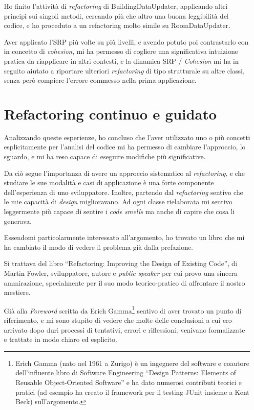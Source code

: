 \documentclass[12pt]{report}
\begin{document}
Ho finito l'attività di \textit{refactoring} di BuildingDataUpdater,
applicando altri principi sui singoli metodi, cercando più che altro
una buona leggibilità del codice,
e ho proceduto a un refactoring molto simile su RoomDataUpdater. 

Aver applicato l'SRP più volte su più livelli, e avendo potuto poi 
contrastarlo con in concetto di \textit{cohesion}, mi ha permesso 
di cogliere una significativa intuizione pratica da riapplicare in 
altri contesti, e la dinamica SRP / \textit{Cohesion} mi ha in seguito 
aiutato a riportare ulteriori \textit{refactoring} di tipo strutturale 
su altre classi, senza però compiere l'errore commesso nella 
prima applicazione.


%
%
%
%
\chapter{Refactoring continuo e guidato}
\label{cap5}

Analizzando queste esperienze, ho concluso che l'aver utilizzato uno o più
concetti esplicitamente per l'analisi del codice mi ha permesso di
cambiare l'approccio, lo sguardo, e mi ha reso capace di eseguire
modifiche più significative.

Da ciò segue l'importanza di avere un approccio sistematico al 
\textit{refactoring}, e che studiare le sue modalità e casi di applicazione
è una forte componente dell'esperienza di uno sviluppatore. Inoltre, partendo
dal \textit{refactoring} sentivo che le mie capacità di \textit{design}
miglioravano. Ad ogni classe rielaborata mi sentivo leggermente più
capace di sentire i \textit{code smells} ma anche di capire 
che cosa li generava.

Essendomi particolarmente interessato all'argomento, ho trovato un libro 
che mi ha cambiato il modo di vedere il problema già dalla prefazione.

Si trattava del libro ``Refactoring: Improving the Design of
Existing Code''\cite{fowler2002}, di Martin Fowler, sviluppatore, 
autore e \textit{public speaker} per cui provo una sincera ammirazione,
specialmente per il suo modo teorico-pratico di affrontare il nostro
mestiere. 

Già alla \textit{Foreword} scritta da Erich Gamma\footnote{
Erich Gamma (nato nel 1961 a Zurigo) è un ingegnere del software e
coautore dell'influente libro di Software Engineering ``Design Patterns: 
Elements of Reusable Object-Oriented Software'' e ha dato numerosi contributi
teorici e pratici (ad esempio ha creato il framework per il testing 
JUnit insieme a Kent Beck) sull'argomento.
}
sentivo di aver trovato un punto di riferimento, e mi sono stupito di
vedere che molte delle conclusioni a cui ero arrivato dopo
duri processi di tentativi, errori e riflessioni, venivano formalizzate
e trattate in modo chiaro ed esplicito.
\end{document}
